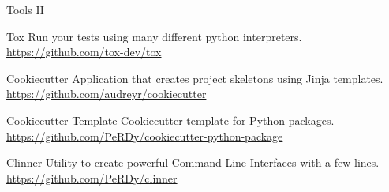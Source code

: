 \begin{frame}[fragile]{Tools II}
    \begin{block}{Tox}
        Run your tests using many different python interpreters.
        \href{https://github.com/tox-dev/tox}{https://github.com/tox-dev/tox}
    \end{block}
    \pause
    \begin{block}{Cookiecutter}
        Application that creates project skeletons using Jinja templates.
        \href{https://github.com/audreyr/cookiecutter}{https://github.com/audreyr/cookiecutter}
    \end{block}
    \pause
    \begin{block}{Cookiecutter Template}
        Cookiecutter template for Python packages.
        \href{https://github.com/PeRDy/cookiecutter-python-package}{https://github.com/PeRDy/cookiecutter-python-package}
    \end{block}
    \pause
    \begin{block}{Clinner}
        Utility to create powerful Command Line Interfaces with a few lines.
        \href{https://github.com/PeRDy/clinner}{https://github.com/PeRDy/clinner}
    \end{block}
\end{frame}

